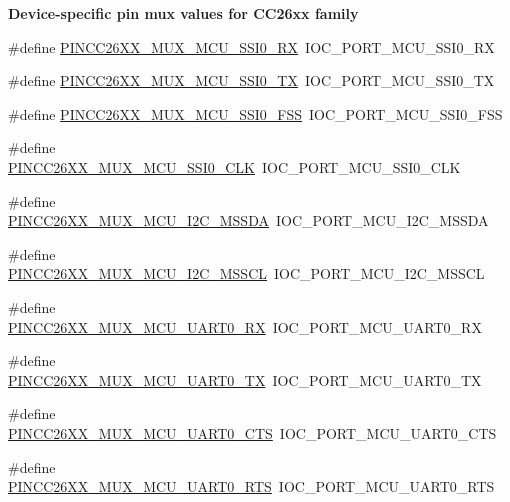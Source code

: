 \begin{Indent}{\bf Device-\/specific pin mux values for C\+C26xx family}
\begin{DoxyCompactItemize}
\#define \hyperlink{_p_i_n_c_c26_x_x_8h_ac72b13e3e19d75a4ce2240955786660d}{P\+I\+N\+C\+C26\+X\+X\+\_\+\+M\+U\+X\+\_\+\+M\+C\+U\+\_\+\+S\+S\+I0\+\_\+\+R\+X}~I\+O\+C\+\_\+\+P\+O\+R\+T\+\_\+\+M\+C\+U\+\_\+\+S\+S\+I0\+\_\+\+R\+X
\item 
\#define \hyperlink{_p_i_n_c_c26_x_x_8h_a330141f9fd840aec1b7c4cabc111363a}{P\+I\+N\+C\+C26\+X\+X\+\_\+\+M\+U\+X\+\_\+\+M\+C\+U\+\_\+\+S\+S\+I0\+\_\+\+T\+X}~I\+O\+C\+\_\+\+P\+O\+R\+T\+\_\+\+M\+C\+U\+\_\+\+S\+S\+I0\+\_\+\+T\+X
\item 
\#define \hyperlink{_p_i_n_c_c26_x_x_8h_a1ac8e06c048c6a1951e11054abcf1c60}{P\+I\+N\+C\+C26\+X\+X\+\_\+\+M\+U\+X\+\_\+\+M\+C\+U\+\_\+\+S\+S\+I0\+\_\+\+F\+S\+S}~I\+O\+C\+\_\+\+P\+O\+R\+T\+\_\+\+M\+C\+U\+\_\+\+S\+S\+I0\+\_\+\+F\+S\+S
\item 
\#define \hyperlink{_p_i_n_c_c26_x_x_8h_a77b7d2034982c09c8c3a75591b226e95}{P\+I\+N\+C\+C26\+X\+X\+\_\+\+M\+U\+X\+\_\+\+M\+C\+U\+\_\+\+S\+S\+I0\+\_\+\+C\+L\+K}~I\+O\+C\+\_\+\+P\+O\+R\+T\+\_\+\+M\+C\+U\+\_\+\+S\+S\+I0\+\_\+\+C\+L\+K
\item 
\#define \hyperlink{_p_i_n_c_c26_x_x_8h_aa3db9a339c53a66396c6fdfde6d6062c}{P\+I\+N\+C\+C26\+X\+X\+\_\+\+M\+U\+X\+\_\+\+M\+C\+U\+\_\+\+I2\+C\+\_\+\+M\+S\+S\+D\+A}~I\+O\+C\+\_\+\+P\+O\+R\+T\+\_\+\+M\+C\+U\+\_\+\+I2\+C\+\_\+\+M\+S\+S\+D\+A
\item 
\#define \hyperlink{_p_i_n_c_c26_x_x_8h_aa617fb5a0aeeda3e4bf7150d5e76a397}{P\+I\+N\+C\+C26\+X\+X\+\_\+\+M\+U\+X\+\_\+\+M\+C\+U\+\_\+\+I2\+C\+\_\+\+M\+S\+S\+C\+L}~I\+O\+C\+\_\+\+P\+O\+R\+T\+\_\+\+M\+C\+U\+\_\+\+I2\+C\+\_\+\+M\+S\+S\+C\+L
\item 
\#define \hyperlink{_p_i_n_c_c26_x_x_8h_ab2932b3af0495872bf444b90cb83d2c0}{P\+I\+N\+C\+C26\+X\+X\+\_\+\+M\+U\+X\+\_\+\+M\+C\+U\+\_\+\+U\+A\+R\+T0\+\_\+\+R\+X}~I\+O\+C\+\_\+\+P\+O\+R\+T\+\_\+\+M\+C\+U\+\_\+\+U\+A\+R\+T0\+\_\+\+R\+X
\item 
\#define \hyperlink{_p_i_n_c_c26_x_x_8h_a5b92514b6f947d9d333927e7f6973677}{P\+I\+N\+C\+C26\+X\+X\+\_\+\+M\+U\+X\+\_\+\+M\+C\+U\+\_\+\+U\+A\+R\+T0\+\_\+\+T\+X}~I\+O\+C\+\_\+\+P\+O\+R\+T\+\_\+\+M\+C\+U\+\_\+\+U\+A\+R\+T0\+\_\+\+T\+X
\item 
\#define \hyperlink{_p_i_n_c_c26_x_x_8h_a522aeda2895c5cb3b0193b2ef3c2d718}{P\+I\+N\+C\+C26\+X\+X\+\_\+\+M\+U\+X\+\_\+\+M\+C\+U\+\_\+\+U\+A\+R\+T0\+\_\+\+C\+T\+S}~I\+O\+C\+\_\+\+P\+O\+R\+T\+\_\+\+M\+C\+U\+\_\+\+U\+A\+R\+T0\+\_\+\+C\+T\+S
\item 
\#define \hyperlink{_p_i_n_c_c26_x_x_8h_a51f1fec524b48909fcfd7f619fb0c008}{P\+I\+N\+C\+C26\+X\+X\+\_\+\+M\+U\+X\+\_\+\+M\+C\+U\+\_\+\+U\+A\+R\+T0\+\_\+\+R\+T\+S}~I\+O\+C\+\_\+\+P\+O\+R\+T\+\_\+\+M\+C\+U\+\_\+\+U\+A\+R\+T0\+\_\+\+R\+T\+S

\end{DoxyCompactItemize}
\end{Indent}
